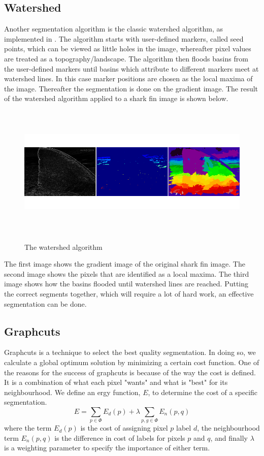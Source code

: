 \documentclass[a4paper,10pt]{article}
\begin{document}
\subsection{Watershed}
\label{watershed}
Another segmentation algorithm is the classic watershed algorithm, as
implemented in \cite{scikit}.  The algorithm starts with user-defined markers,
called seed points, which can be viewed as little holes in the image, whereafter
pixel values are treated as a topography/landscape.  The algorithm then floods
basins from the user-defined markers until basins which attribute to different
markers meet at watershed lines.  In this case marker positions are chosen as
the local maxima of the image.  Thereafter the segmentation is done on the
gradient image.  The result of the watershed algorithm applied to a shark fin
image is shown below.

\begin{figure}[H]
\centering
\includegraphics[width=5in,height=2.5in]{watershed.png} 
\label{fig1}
\caption{The watershed algorithm}
\end{figure}

\noindent The first image shows the gradient image of the original shark fin
image.  The second image shows the pixels that are identified as a local maxima.
 The third image shows how the basins flooded until watershed lines are reached.
 Putting the correct segments together, which will require a lot of hard work,
an effective segmentation can be done.

\subsection{Graphcuts}
Graphcuts is a technique to select the best quality segmentation.  In doing so,
we calculate a global optimum solution by minimizing a certain 
cost function.  One of the reasons for the success of graphcuts is because of
the way the cost is defined.  It is a combination of what each pixel
"wants" and what is "best" for its neighbourhood.  We define an ergy function,
$E$, to determine the cost of a specific segmentation.
\[
 E = \sum_{p \in \Phi}E_d(p) + \lambda\sum_{p,g \in \Phi}E_n(p, q)
\]
where the term $E_d(p)$ is the cost of assigning pixel $p$ label $d$, the
neighbourhood term $E_n(p, q)$ is the difference in cost of labels for pixels
$p$ 
and $q$, and finally $\lambda$ is a weighting parameter to specify the
importance of either term.
\end{document}
